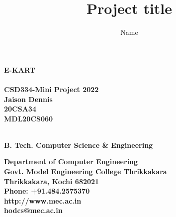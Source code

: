 \documentclass[11pt]{report}
\begin{document}
\renewcommand\bibname{References}
\pagestyle{fancy}
\fancyfoot{}
\fancyfoot[c]{\thepage}
\renewcommand{\chaptermark}[1]{
\markboth{\thechapter.\ #1}{}} 
\renewcommand{\headrulewidth}{0.1pt}
\fancyhead[r]{\slshape \leftmark}
\addtolength{\headheight}{\baselineskip}

\lhead{\nouppercase{\rightmark}}
\rhead{\nouppercase{\leftmark}}
%
\title {Project title}
\author {Name}

\begin{titlepage}
\begin{center}

\Huge{\textbf{E-KART}}\\
\large{\textbf{\\CSD334-Mini Project 2022\\}}
\vspace{1.2in}
\Large{\textbf{Jaison Dennis}}\\ 
\Large{\textbf{20CSA34\\
MDL20CS060\\
}}	\hspace{.1in}	

\Large{\textbf{
\\B. Tech. Computer Science \& Engineering
}}


\vspace{.6in}
\begin{figure}[h]
\begin{center}
\end{center}
\end{figure}
\textbf{
Department of Computer Engineering\\
Govt. Model Engineering College Thrikkakara\\
Thrikkakara, Kochi 682021\\
Phone: +91.484.2575370\\
http://www.mec.ac.in \\
hodcs@mec.ac.in
}
\end{center}
\end{titlepage}
\end{document}
